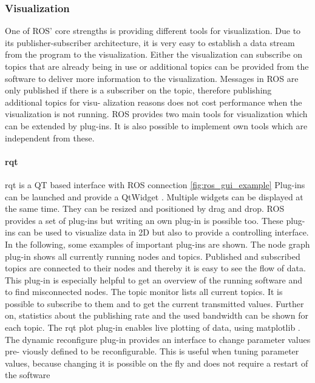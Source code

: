 \subsubsection*{Visualization}
One of ROS’ core strengths is providing different tools for visualization.  Due to its
publisher-subscriber architecture, it is very easy to establish a data stream from the
program to the visualization.  Either the visualization can subscribe on topics that
are already being in use or additional topics can be provided from the software to
deliver more information to the visualization.  Messages in ROS are only published
if there is a subscriber on the topic, therefore publishing additional topics for visu-
alization reasons does not cost performance when the visualization is not running.
ROS provides two main tools for visualization which can be extended by plug-ins.
It is also possible to implement own tools which are independent from these.

\paragraph*{rqt}
rqt  is  a  QT  based  interface  with  ROS  connection \ref{fig:ros_gui_example}   Plug-ins  can  be
launched and provide a
QtWidget
.  Multiple widgets can be displayed at the same
time.  They can be resized and positioned by drag and drop.  ROS provides a set
of plug-ins but writing an own plug-in is possible too.  These plug-ins can be used
to visualize data in 2D but also to provide a controlling interface.  In the following,
some examples of important plug-ins are shown.
The
node
graph
plug-in shows all currently running nodes and topics.  Published
and subscribed topics are connected to their nodes and thereby it is easy to see the
flow of data.  This plug-in is especially helpful to get an overview of the running
software and to find misconnected nodes.
The
topic
monitor
lists all current topics.  It is possible to subscribe to them and
to get the current transmitted values.  Further on, statistics about the publishing
rate and the used bandwidth can be shown for each topic.
The
rqt
plot
plug-in  enables  live  plotting  of  data,  using
matplotlib
.    The
dynamic
reconfigure
plug-in provides an interface to change parameter values pre-
viously defined to be reconfigurable.  This is useful when tuning parameter values,
because  changing  it  is  possible  on  the  fly  and  does  not  require  a  restart  of  the
software


